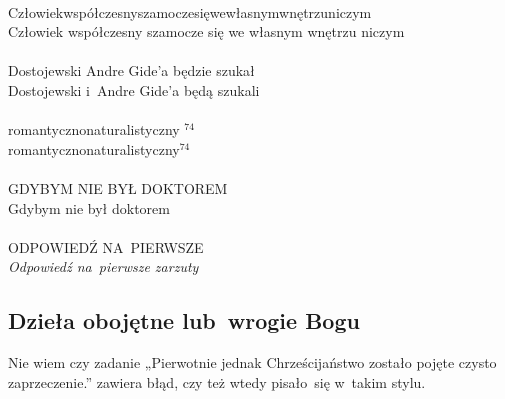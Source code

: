 \documentclass[a4paper,11pt]{article}
\begin{document}
\noindent
{} \\
\Jest  Człowiekwspółczesnyszamoczesięwewłasnymwnętrzuniczym \\
\Powin Człowiek współczesny szamocze się we własnym wnętrzu niczym \\
 \\
\Jest  Dostojewski Andre Gide'a będzie szukał \\
\Powin Dostojewski i~Andre Gide'a będą szukali \\
 \\
\Jest  romantyczno\dywiz naturalistyczny $^{ 74 }$ \\
\Powin romantyczno\dywiz naturalistyczny$^{ 74 }$ \\
 \\
\Jest  G{\footnotesize DYBYM NIE BYŁ DOKTOREM} \\
\Powin Gdybym nie był doktorem \\
 \\
\Jest  ODPOWIEDŹ NA~PIERWSZE \\
\Powin \textit{Odpowiedź na~pierwsze zarzuty} \\












\newpage
\subsection{Dzieła obojętne lub~wrogie Bogu}

\vspace{\spaceTwo}







\start {} Nie wiem czy zadanie „Pierwotnie jednak
Chrześcijaństwo zostało pojęte czysto zaprzeczenie.” zawiera błąd,
czy też wtedy pisało~się w~takim stylu.
\end{document}
